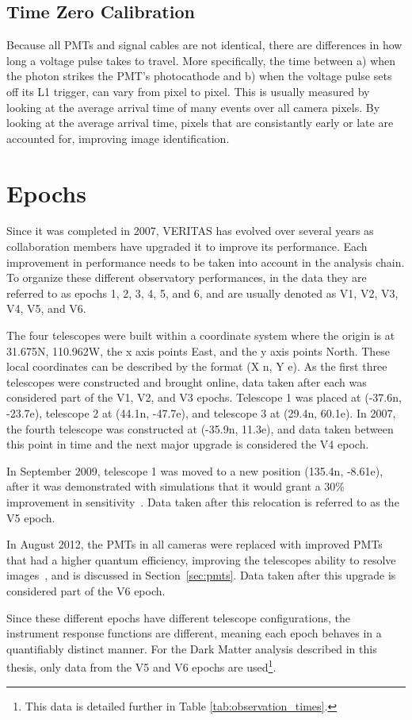 \subsection{Time Zero Calibration}
Because all PMTs and signal cables are not identical, there are differences in how long a voltage pulse takes to travel.
More specifically, the time between a) when the photon strikes the PMT's photocathode and b) when the voltage pulse sets off its L1 trigger, can vary from pixel to pixel.
This is usually measured by looking at the average arrival time of many events over all camera pixels.
By looking at the average arrival time, pixels that are consistantly early or late are accounted for, improving image identification.

\section{Epochs}\label{sec:epochs}
Since it was completed in 2007, VERITAS has evolved over several years as collaboration members have upgraded it to improve its performance.
Each improvement in performance needs to be taken into account in the analysis chain.
To organize these different observatory performances, in the data they are referred to as epochs 1, 2, 3, 4, 5, and 6, and are usually denoted as V1, V2, V3, V4, V5, and V6.

The four telescopes were built within a coordinate system where the origin is at 31.675N, 110.962W, the x axis points East, and the y axis points North.
These local coordinates can be described by the format (X n, Y e).
As the first three telescopes were constructed and brought online, data taken after each was considered part of the V1, V2, and V3 epochs.
Telescope 1 was placed at (-37.6n, -23.7e), telescope 2 at (44.1n, -47.7e), and telescope 3 at (29.4n, 60.1e).
In 2007, the fourth telescope was constructed at (-35.9n, 11.3e), and data taken between this point in time and the next major upgrade is considered the V4 epoch.

In September 2009, telescope 1 was moved to a new position (135.4n, -8.61e), after it was demonstrated with simulations that it would grant a \nicetilde{}30\% improvement in sensitivity~\cite{veritas_t1_move}.
Data taken after this relocation is referred to as the V5 epoch.

In August 2012, the PMTs in all cameras were replaced with improved PMTs that had a higher quantum efficiency, improving the telescopes ability to resolve images~\cite{pmtmodels}, and is discussed in Section~\ref{sec:pmts}.
Data taken after this upgrade is considered part of the V6 epoch.

Since these different epochs have different telescope configurations, the instrument response functions are different, meaning each epoch behaves in a quantifiably distinct manner.
For the Dark Matter analysis described in this thesis, only data from the V5 and V6 epochs are used\footnote{This data is detailed further in Table \ref{tab:observation_times}.}.


